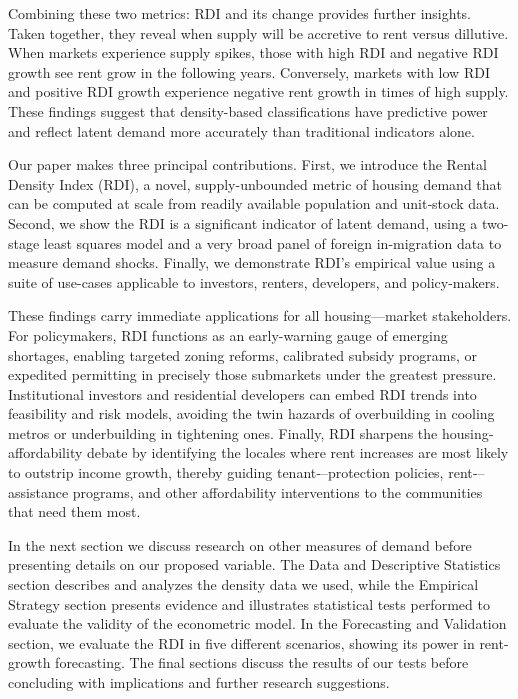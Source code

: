 \documentclass[APA,Times1COL]{WileyNJDv5} %
\begin{document}
Combining these two metrics: RDI and its change provides further insights. Taken together, they reveal when supply will be accretive to rent versus dillutive. When markets experience supply spikes, those with high RDI and negative RDI growth see rent grow in the following years. Conversely, markets with low RDI and positive RDI growth experience negative rent growth in times of high supply. These findings suggest that density-based classifications have predictive power and reflect latent demand more accurately than traditional indicators alone.

Our paper makes three principal contributions. First, we introduce the Rental Density Index (RDI), a novel, supply-unbounded metric of housing demand that can be computed at scale from readily available population and unit‐stock data. Second, we show the RDI is a significant indicator of latent demand, using a two-stage least squares model and a very broad panel of foreign in-migration data to measure demand shocks. Finally, we demonstrate RDI’s empirical value using a suite of use-cases applicable to investors, renters, developers, and policy-makers.

These findings carry immediate applications for all housing---market stakeholders. For policymakers, RDI functions as an early-warning gauge of emerging shortages, enabling targeted zoning reforms, calibrated subsidy programs, or expedited permitting in precisely those submarkets under the greatest pressure. Institutional investors and residential developers can embed RDI trends into feasibility and risk models, avoiding the twin hazards of overbuilding in cooling metros or underbuilding in tightening ones. Finally, RDI sharpens the housing‐affordability debate by identifying the locales where rent increases are most likely to outstrip income growth, thereby guiding tenant‐--protection policies, rent‐--assistance programs, and other affordability interventions to the communities that need them most.

In the next section we discuss research on other measures of demand before presenting details on our proposed variable. The Data and Descriptive Statistics section describes and analyzes the density data we used, while the Empirical Strategy section presents evidence and illustrates statistical tests performed to evaluate the validity of the econometric model. In the Forecasting and Validation section, we evaluate the RDI in five different scenarios, showing its power in rent-growth forecasting. The final sections discuss the results of our tests before concluding with implications and further research suggestions. 
\end{document}
